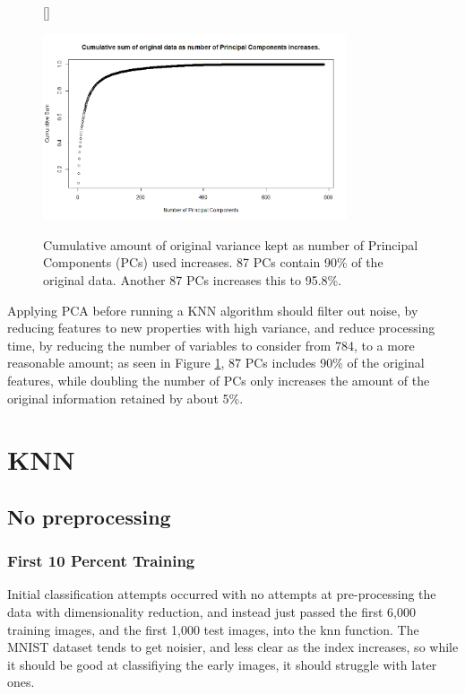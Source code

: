\documentclass[11pt]{article} %
\begin{document}
\begin{figure}[htb!]
[\FBwidth]
{\caption{Cumulative amount of original variance kept as number of Principal Components (PCs) used increases. 87 PCs contain 90\% of the original data. Another 87 PCs increases this to 95.8\%.}\label{fig:cumsum_pca}}
{\includegraphics[width=0.8\textwidth]{cumulative_pca.png}}
\end{figure}

Applying PCA before running a KNN algorithm should filter out noise, by reducing features to new properties with high variance, and reduce processing time, by reducing the number of variables to consider from 784, to a more reasonable amount; as seen in Figure \ref{fig:cumsum_pca}, 87 PCs includes 90\% of the original features, while doubling the number of PCs only increases the amount of the original information retained by about 5\%.



\section{KNN}

\subsection{No preprocessing}

\subsubsection{First 10 Percent Training}

Initial classification attempts occurred with no attempts at pre-processing the data with dimensionality reduction, and instead just passed the first 6,000 training images, and the first 1,000 test images, into the knn function. The MNIST dataset tends to get noisier, and less clear as the index increases, so while it should be good at classifiying the early images, it should struggle with later ones. 
\end{document}
